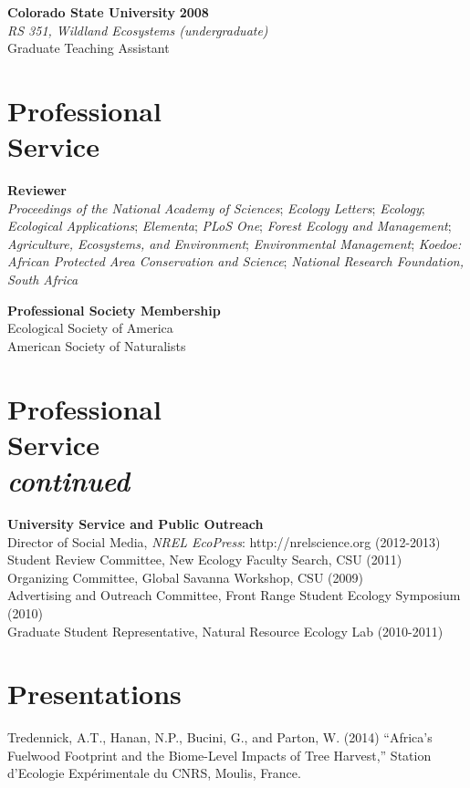 \documentclass[margin,line]{resume}
\begin{document}
\begin{resume}
     \textbf{Colorado State University} \hfill \textbf{2008}\\ 
               \textsl{RS 351, Wildland Ecosystems (undergraduate)}\\
               Graduate Teaching Assistant 
  \newpage
    \section{\mysidestyle Professional\\Service}
    \textbf{Reviewer}\\
    	\textsl{Proceedings of the National Academy of Sciences};
	\textsl{Ecology Letters};
  \textsl{Ecology};
	\textsl{Ecological Applications};
  \textsl{Elementa};
  \textsl{PLoS One};
	\textsl{Forest Ecology and Management};
	\textsl{Agriculture, Ecosystems, and Environment};
	\textsl{Environmental Management};
	 \textsl{Koedoe: African Protected Area Conservation and Science};
	\textsl{National Research Foundation, South Africa}
	

 \textbf{Professional Society Membership}\\
    	Ecological Society of America\\
	American Society of Naturalists

\section{\mysidestyle Professional\\Service\\ \textsl{\footnotesize continued}}
   \textbf{University Service and Public Outreach}\\
   	Director of Social Media, \textsl{NREL EcoPress}: http://nrelscience.org (2012-2013)\\
	Student Review Committee, New Ecology Faculty Search, CSU (2011)\\
	Organizing Committee, Global Savanna Workshop, CSU (2009)\\
	Advertising and Outreach Committee, Front Range Student Ecology Symposium (2010)\\
	Graduate Student Representative, Natural Resource Ecology Lab (2010-2011)
  
    \section{\mysidestyle Presentations}
    Tredennick, A.T., Hanan, N.P., Bucini, G., and Parton, W. (2014) ``Africa's Fuelwood Footprint and the Biome-Level Impacts of Tree Harvest,'' Station d'Ecologie Exp\'{e}rimentale du CNRS, Moulis, France. \vspace{-6mm}\\%
    

\end{resume}
\end{document}
